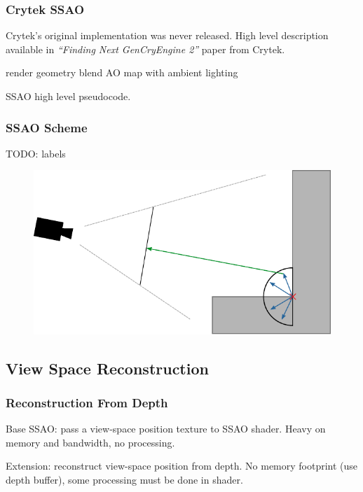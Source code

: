 \documentclass{beamer}
\begin{document}
\begin{frame}
\frametitle{Crytek SSAO}
Crytek's original implementation was never released. High level description available in  \emph{``Finding Next Gen\textemdash{}CryEngine 2''} paper from Crytek.

\begin{algorithm}[H]
    render geometry\;
    blend AO map with ambient lighting\;
    \caption{SSAO high level pseudocode.}
\end{algorithm}

\end{frame}

\begin{frame}
\frametitle{SSAO Scheme}
TODO: labels
\begin{figure}
    \centering
    \includegraphics[width=0.9\linewidth]{images/ssao_scheme}
\end{figure}

\end{frame}

\subsection{View Space Reconstruction}
\begin{frame}
\frametitle{Reconstruction From Depth}
Base SSAO: pass a view-space position texture to SSAO shader. Heavy on memory and bandwidth, no processing.

Extension: reconstruct view-space position from depth. No memory footprint (use depth buffer), some processing must be done in shader.
\end{frame}
\end{document}
